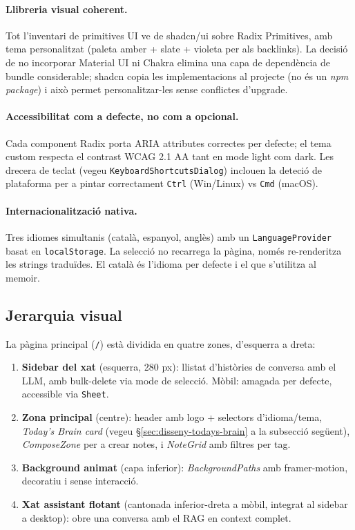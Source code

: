 \paragraph{Llibreria visual coherent.} Tot l'inventari de primitives UI ve de shadcn/ui sobre Radix Primitives, amb tema personalitzat (paleta amber + slate + violeta per als backlinks). La decisió de no incorporar Material UI ni Chakra elimina una capa de dependència de bundle considerable; shadcn copia les implementacions al projecte (no és un \emph{npm package}) i això permet personalitzar-les sense conflictes d'upgrade.

\paragraph{Accessibilitat com a defecte, no com a opcional.} Cada component Radix porta ARIA attributes correctes per defecte; el tema custom respecta el contrast WCAG 2.1 AA tant en mode light com dark. Les drecera de teclat (vegeu \texttt{KeyboardShortcutsDialog}) inclouen la deteció de plataforma per a pintar correctament \texttt{Ctrl} (Win/Linux) vs \texttt{Cmd} (macOS).

\paragraph{Internacionalització nativa.} Tres idiomes simultanis (català, espanyol, anglès) amb un \texttt{LanguageProvider} basat en \texttt{localStorage}. La selecció no recarrega la pàgina, només re-renderitza les strings traduïdes. El català és l'idioma per defecte i el que s'utilitza al memoir.

\subsection{Jerarquia visual}

La pàgina principal (\texttt{/}) està dividida en quatre zones, d'esquerra a dreta:

\begin{enumerate}
    \item \textbf{Sidebar del xat} (esquerra, 280 px): llistat d'històries de conversa amb el LLM, amb bulk-delete via mode de selecció. Mòbil: amagada per defecte, accessible via \texttt{Sheet}.
    \item \textbf{Zona principal} (centre): header amb logo + selectors d'idioma/tema, \emph{Today's Brain card} (vegeu \S\ref{sec:disseny-todays-brain} a la subsecció següent), \emph{ComposeZone} per a crear notes, i \emph{NoteGrid} amb filtres per tag.
    \item \textbf{Background animat} (capa inferior): \emph{BackgroundPaths} amb framer-motion, decoratiu i sense interacció.
    \item \textbf{Xat assistant flotant} (cantonada inferior-dreta a mòbil, integrat al sidebar a desktop): obre una conversa amb el RAG en context complet.
\end{enumerate}

